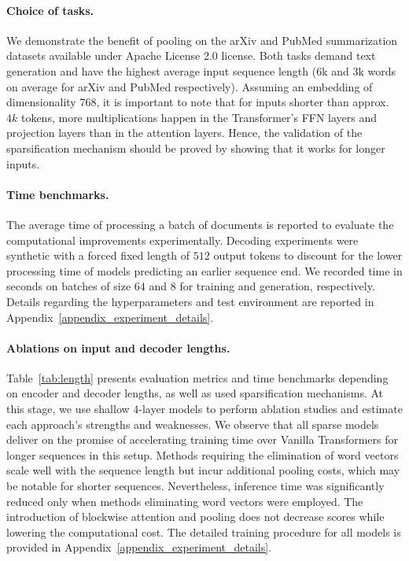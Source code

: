 \documentclass{article}
\begin{document}
\paragraph{Choice of tasks.} We demonstrate the benefit of pooling on the arXiv and PubMed summarization datasets \cite{cohan-etal-2018-discourse} available under Apache License 2.0 license. Both tasks demand text generation and have the highest average input sequence length ($6$k and $3$k words on average for arXiv and PubMed respectively). Assuming an embedding of dimensionality $768$, it is important to note that for inputs shorter than approx. $4k$ tokens, more multiplications happen in the Transformer's FFN layers and projection layers than in the attention layers. Hence, the validation of the sparsification mechanism should be proved by showing that it works for longer inputs.


\paragraph{Time benchmarks.} The average time of processing a batch of documents is reported to evaluate the computational improvements experimentally. Decoding experiments were synthetic with a forced fixed length of $512$ output tokens to discount for the lower processing time of models predicting an earlier sequence end.
We recorded time in seconds on batches of size $64$ and $8$ for training and generation, respectively. Details regarding the hyperparameters and test environment are reported in Appendix~\ref{appendix_experiment_details}.

\paragraph{Ablations on input and decoder lengths.} Table~\ref{tab:length} presents evaluation metrics and time benchmarks depending on encoder and decoder lengths, as well as used sparsification mechanisms. At this stage, we use shallow $4$-layer models to perform ablation studies and estimate each approach's strengths and weaknesses. We observe that all sparse models deliver on the promise of accelerating training time over Vanilla Transformers for longer sequences in this setup. Methods requiring the elimination of word vectors scale well with the sequence length but incur additional pooling costs, which may be notable for shorter sequences.
Nevertheless, inference time was significantly reduced only when methods eliminating word vectors were employed. The introduction of blockwise attention and pooling does not decrease scores while lowering the computational cost. The detailed training procedure for all models is provided in Appendix~\ref{appendix_experiment_details}.
\end{document}
